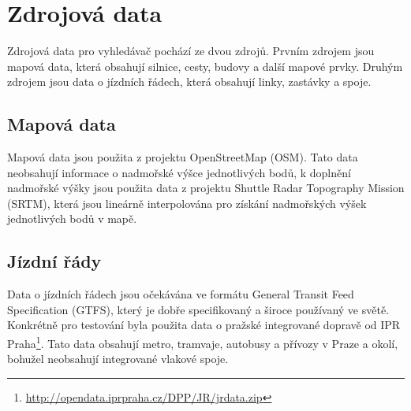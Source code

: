 \chapter{Zdrojová data}

Zdrojová data pro vyhledávač pochází ze dvou zdrojů. Prvním zdrojem jsou mapová
data, která obsahují silnice, cesty, budovy a další mapové prvky. Druhým zdrojem
jsou data o jízdních řádech, která obsahují linky, zastávky a spoje.

\section{Mapová data}
Mapová data jsou použita z projektu OpenStreetMap (OSM). Tato data neobsahují
informace o nadmořské výšce jednotlivých bodů, k doplnění nadmořské výšky jsou
použita data z projektu Shuttle Radar Topography Mission (SRTM), která jsou
lineárně interpolována pro získání nadmořských výšek jednotlivých bodů v mapě.

\section{Jízdní řády}
Data o jízdních řádech jsou očekávána ve formátu General Transit Feed
Specification (GTFS), který je dobře specifikovaný a široce používaný ve světě.
Konkrétně pro testování byla použita data o pražské integrované dopravě od IPR
Praha\footnote{\url{http://opendata.iprpraha.cz/DPP/JR/jrdata.zip}}. Tato data
obsahují metro, tramvaje, autobusy a přívozy v Praze a okolí, bohužel neobsahují
integrované vlakové spoje.

